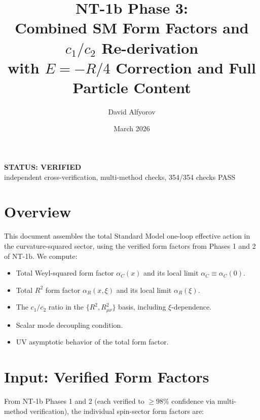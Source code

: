 \documentclass[11pt,a4paper]{article}
\title{%
  \textbf{NT-1b Phase 3:}\\[6pt]
  \Large Combined SM Form Factors and $c_1/c_2$ Re-derivation\\[4pt]
  \large with $E = -R/4$ Correction and Full Particle Content
}
\author{David Alfyorov}
\date{March 2026}
\begin{document}
\maketitle


\begin{center}
\end{center}

\begin{center}
  \colorbox{verified!15}{\parbox{0.6\textwidth}{\centering
    \textbf{\color{verified} STATUS: VERIFIED}\\[2pt]
    \small independent cross-verification, multi-method checks, 354/354 checks PASS
  }}
\end{center}

\vspace{1em}

\section{Overview}

This document assembles the total Standard Model one-loop effective action
in the curvature-squared sector, using the verified form factors from
Phases 1 and 2 of NT-1b. We compute:

\begin{itemize}
  \item Total Weyl-squared form factor $\alpha_C(x)$ and its local limit $\alpha_C \equiv \alpha_C(0)$.
  \item Total $R^2$ form factor $\alpha_R(x,\xi)$ and its local limit $\alpha_R(\xi)$.
  \item The $c_1/c_2$ ratio in the $\{R^2, R_{\mu\nu}^2\}$ basis, including $\xi$-dependence.
  \item Scalar mode decoupling condition.
  \item UV asymptotic behavior of the total form factor.
\end{itemize}

\section{Input: Verified Form Factors}

From NT-1b Phases 1 and 2 (each verified to $\geq 98\%$ confidence via
multi-method verification), the individual spin-sector form factors are:
\end{document}

